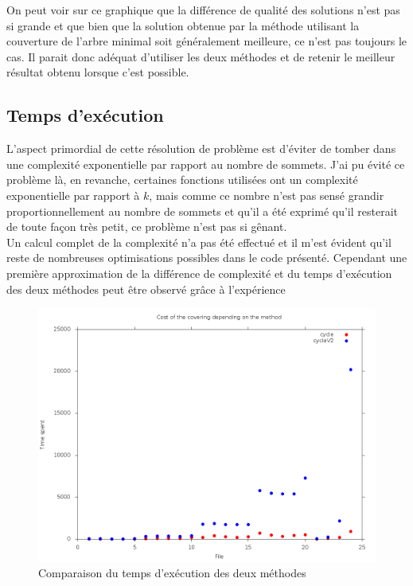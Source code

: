 \documentclass[a4paper,12pt]{article}
\begin{document}
On peut voir sur ce graphique que la différence de qualité des solutions n'est
pas si grande et que bien que la solution obtenue par la méthode utilisant la
couverture de l'arbre minimal soit généralement meilleure, ce n'est pas toujours
le cas. Il parait donc adéquat d'utiliser les deux méthodes et de retenir
le meilleur résultat obtenu lorsque c'est possible.

\subsection{Temps d'exécution}
L'aspect primordial de cette résolution de problème est d'éviter de tomber dans
une complexité exponentielle par rapport au nombre de sommets. J'ai pu évité ce
problème là, en revanche, certaines fonctions utilisées ont un complexité
exponentielle par rapport à $k$, mais comme ce nombre n'est pas sensé grandir
proportionnellement au nombre de sommets et qu'il a été exprimé qu'il resterait
de toute façon très petit, ce problème n'est pas si gênant.
\\
Un calcul complet de la complexité n'a pas été effectué et il m'est évident
qu'il reste de nombreuses optimisations possibles dans le code présenté.
Cependant une première approximation de la différence de complexité et du temps
d'exécution des deux méthodes peut être observé grâce à l'expérience

\begin{figure}[H]
  \caption{Comparaison du temps d'exécution des deux méthodes}
  \includegraphics[width = \textwidth]{time_comparison.png}
\end{figure}
\end{document}
